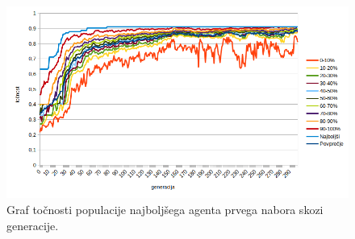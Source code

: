 %

\begin{figure}[H]
    \begin{center}
        \includegraphics[width=13cm]{wine/1/acc}
    \end{center}
    \caption{Graf točnosti populacije najboljšega agenta prvega nabora skozi generacije.}
    \label{fig:wine_acc_1}
\end{figure}

